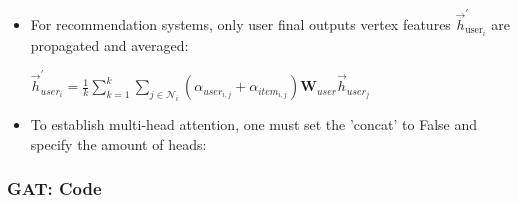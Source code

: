 \documentclass{beamer}
\begin{document}

\begin{frame}[fragile]
\begin{itemize}
\frametitle{(Optional 4) Multi-Head Attention: Case Study}
[ball]

\item For recommendation systems, only user final outputs vertex features $\overrightarrow{h}_{\text{user}_i}^{'}$ are propagated and averaged:

\vspace{0.3cm}

\begin{center}
    $\overrightarrow{h}_{user_{i}}^{'} = \frac{1}{k} \sum_{k=1}^{k} \sum_{j \in \mathcal{N}_{i}} (\alpha_{user_{i,j}}+\alpha_{item_{i,j}}) \textbf{W}_{user}\overrightarrow{h}_{user_{j}}$ 
\end{center}

\end{itemize}
\end{frame}


\begin{frame}[fragile]
\begin{itemize}
\frametitle{(Optional 4) Multi-Head Attention: Code}
[ball]

\item To establish multi-head attention, one must set the 'concat' to False and specify the amount of heads: 

\vspace{0.5cm}



\end{itemize}
\end{frame}


\begin{frame}[fragile]
\frametitle{GAT: Code}



\end{frame}
\end{document}
